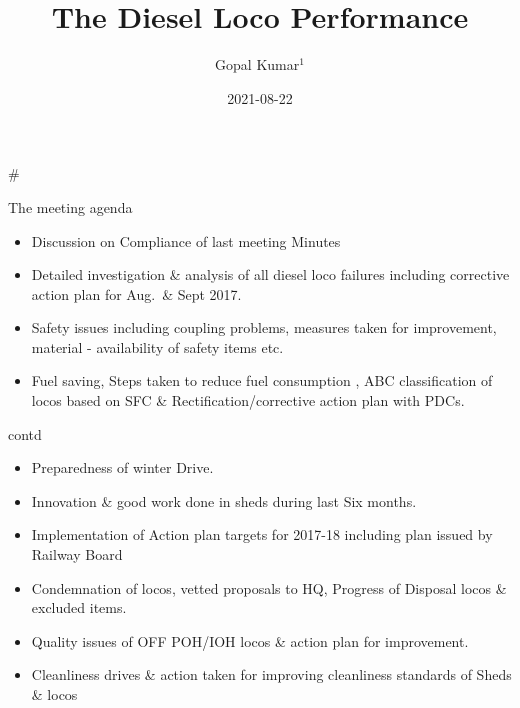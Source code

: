 \documentclass[
  ignorenonframetext,
]{beamer}
\title{The Diesel Loco Performance}
\author{Gopal Kumar\(^1\)}
\date{2021-08-22}
\institute{\(^1\)CMPE(Diesel)}
\providecommand{\tightlist}{%
  \setlength{\itemsep}{0pt}\setlength{\parskip}{0pt}}
\begin{document}
\frame{\titlepage}

\begin{frame}[allowframebreaks]
  \tableofcontents[hideallsubsections]
\end{frame}
\begin{frame}
\#
\end{frame}

\begin{frame}{The meeting agenda}
\protect\hypertarget{the-meeting-agenda}{}
\begin{itemize}[<+->]
\tightlist
\item
  Discussion on Compliance of last meeting Minutes
\item
  Detailed investigation \& analysis of all diesel loco failures
  including corrective action plan for Aug.~\& Sept 2017.
\item
  Safety issues including coupling problems, measures taken for
  improvement, material - availability of safety items etc.
\item
  Fuel saving, Steps taken to reduce fuel consumption , ABC
  classification of locos based on SFC \& Rectification/corrective
  action plan with PDCs.
\end{itemize}

\begin{block}{contd}
\protect\hypertarget{contd}{}
\begin{itemize}[<+->]
\tightlist
\item
  Preparedness of winter Drive.
\item
  Innovation \& good work done in sheds during last Six months.
\item
  Implementation of Action plan targets for 2017-18 including plan
  issued by Railway Board
\item
  Condemnation of locos, vetted proposals to HQ, Progress of Disposal
  locos \& excluded items.
\item
  Quality issues of OFF POH/IOH locos \& action plan for improvement.
\item
  Cleanliness drives \& action taken for improving cleanliness standards
  of Sheds \& locos
\end{itemize}
\end{block}
\end{frame}
\end{document}
